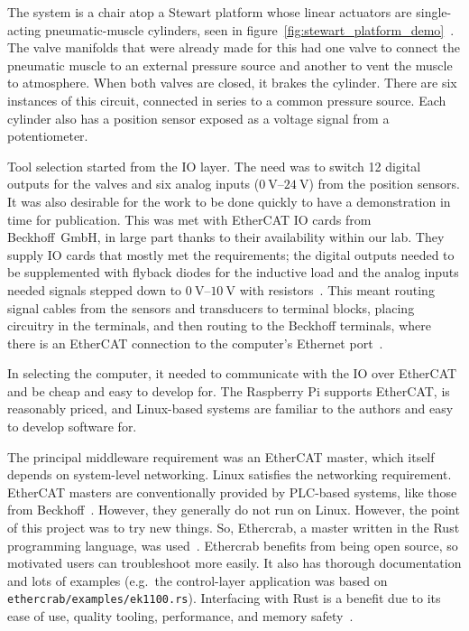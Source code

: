\documentclass[english,12pt,a4paper,pdftex,eng,utf8]{aaltothesis}
\begin{document}
The system is a chair atop a Stewart platform whose linear actuators are single-acting pneumatic-muscle cylinders, seen in figure~\ref{fig:stewart_platform_demo}~\cite{Stewart1965, Caldwell1995}. The valve manifolds that were already made for this had one valve to connect the pneumatic muscle to an external pressure source and another to vent the muscle to atmosphere. When both valves are closed, it brakes the cylinder. There are six instances of this circuit, connected in series to a common pressure source. Each cylinder also has a position sensor exposed as a voltage signal from a potentiometer.

Tool selection started from the IO layer. The need was to switch 12 digital outputs for the valves and six analog inputs ($\qtyrange[range-units=single,range-phrase=..]{0}{24}{\volt}$) from the position sensors. It was also desirable for the work to be done quickly to have a demonstration in time for publication. This was met with EtherCAT IO cards from Beckhoff~GmbH, in large part thanks to their availability within our lab. They supply IO cards that mostly met the requirements; the digital outputs needed to be supplemented with flyback diodes for the inductive load and the analog inputs needed signals stepped down to $\qtyrange[range-units=single,range-phrase=..]{0}{10}{\volt}$ with resistors~\cite{BeckhoffEL2042,BeckhoffEL3062}. This meant routing signal cables from the sensors and transducers to terminal blocks, placing circuitry in the terminals, and then routing to the Beckhoff terminals, where there is an EtherCAT connection to the computer's Ethernet port~\cite{BeckhoffEK1100}.

In selecting the computer, it needed to communicate with the IO over EtherCAT and be cheap and easy to develop for. The Raspberry Pi supports EtherCAT, is reasonably priced, and Linux-based systems are familiar to the authors and easy to develop software for.

The principal middleware requirement was an EtherCAT master, which itself depends on system-level networking. Linux satisfies the networking requirement. EtherCAT masters are conventionally provided by PLC-based systems, like those from Beckhoff~\cite{BeckhoffTwinCAT}. However, they generally do not run on Linux. However, the point of this project was to try new things. So, Ethercrab, a master written in the Rust programming language, was used~\cite{Ethercrab}. Ethercrab benefits from being open source, so motivated users can troubleshoot more easily. It also has thorough documentation and lots of examples (e.g.\ the control-layer application was based on \verb|ethercrab/examples/ek1100.rs|). Interfacing with Rust is a benefit due to its ease of use, quality tooling, performance, and memory safety~\cite{RustHomePage}.
\end{document}
